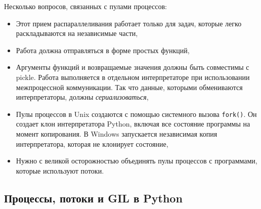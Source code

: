 \documentclass[%
	11pt,
	a4paper,
	utf8,
		]{article}
\begin{document}
Несколько вопросов, связанных с пулами процессов:
\begin{itemize}
	\item Этот прием распараллеливания работает только для задач, которые легко раскладываются на независимые части,
	
	\item Работа должна отправляться в форме простых функций,
	
	\item Аргументы функций и возвращаемые значения должны быть совместимы с pickle. Работа выполняется в отдельном интерпретаторе при использовании межпроцессной коммуникации. Так что данные, которыми обмениваются интерпретаторы, должны \emph{сериализоваться},
	
	\item Пулы процессов в Unix создаются с помощью системного вызова \texttt{fork()}. Он создает клон интерпретатора Python, включая все состояние программы на момент копирования. В Windows запускается независимая копия интерпретатора, которая не клонирует состояние,
	
	\item Нужно с великой осторожностью объединять пулы процессов с программами, которые используют потоки.
\end{itemize}

\subsection{Процессы, потоки и GIL в Python}
\end{document}
